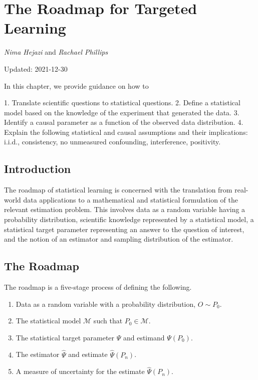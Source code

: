 \documentclass[
  12pt, krantz2,
]{krantz}
\providecommand{\tightlist}{%
  \setlength{\itemsep}{0pt}\setlength{\parskip}{0pt}}
\newcommand{\M}{\mathcal{M}}
\newcommand{\1}{\mathbbm{1}}
\theoremstyle{definition}
\theoremstyle{definition}
\theoremstyle{definition}
\theoremstyle{definition}
\theoremstyle{remark}
\begin{document}
\hypertarget{intro}{%
\chapter{The Roadmap for Targeted Learning}\label{intro}}

\emph{Nima Hejazi} and \emph{Rachael Phillips}

Updated: 2021-12-30

\begin{VT1}



In this chapter, we provide guidance on how to

1. Translate scientific questions to statistical questions.
2. Define a statistical model based on the knowledge of the experiment that
   generated the data.
3. Identify a causal parameter as a function of the observed data distribution.
4. Explain the following statistical and causal assumptions and their
   implications: i.i.d., consistency, no unmeasured confounding, interference,
   positivity.

\end{VT1}

\hypertarget{introduction}{%
\section*{Introduction}\label{introduction}}


The roadmap of statistical learning is concerned with the translation from
real-world data applications to a mathematical and statistical formulation of
the relevant estimation problem. This involves data as a random variable having
a probability distribution, scientific knowledge represented by a statistical
model, a statistical target parameter representing an answer to the question of
interest, and the notion of an estimator and sampling distribution of the
estimator.

\hypertarget{roadmap}{%
\section{The Roadmap}\label{roadmap}}

The roadmap is a five-stage process of defining the following.

\begin{enumerate}
\def\labelenumi{\arabic{enumi}.}
\tightlist
\item
  Data as a random variable with a probability distribution, \(O \sim P_0\).
\item
  The statistical model \(\M\) such that \(P_0 \in \M\).
\item
  The statistical target parameter \(\Psi\) and estimand \(\Psi(P_0)\).
\item
  The estimator \(\hat{\Psi}\) and estimate \(\hat{\Psi}(P_n)\).
\item
  A measure of uncertainty for the estimate \(\hat{\Psi}(P_n)\).
\end{enumerate}
\end{document}
